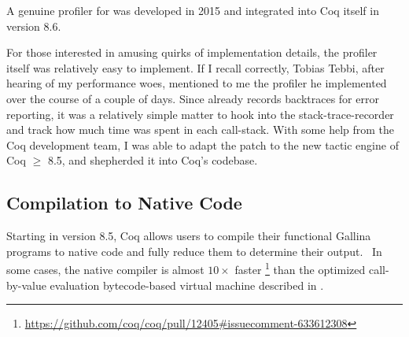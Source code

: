 A genuine profiler for \Ltac\space was developed in 2015 and integrated into Coq itself in version 8.6.~\cite{coqpl-15-ltac-profiler}

For those interested in amusing quirks of implementation details, the profiler itself was relatively easy to implement.
If I recall correctly, Tobias Tebbi, after hearing of my \Ltac\space performance woes, mentioned to me the profiler he implemented over the course of a couple of days.
Since \Ltac\space already records backtraces for error reporting, it was a relatively simple matter to hook into the stack-trace-recorder and track how much time was spent in each call-stack.
With some help from the Coq development team, I was able to adapt the patch to the new tactic engine of Coq $\ge$ 8.5, and shepherded it into Coq's codebase.


\subsection{Compilation to Native Code}\label{sec:native-compiler}
Starting in version 8.5, Coq allows users to compile their functional Gallina programs to native code and fully reduce them to determine their output.~\cite{nativecompute,coq-commit-native-compiler}
In some cases, the native compiler is almost $10\times$ faster%
\footnote{\url{https://github.com/coq/coq/pull/12405\#issuecomment-633612308}}
than the optimized call-by-value evaluation bytecode-based virtual machine described in \textcite{Gregoire-Leroy-02}.

